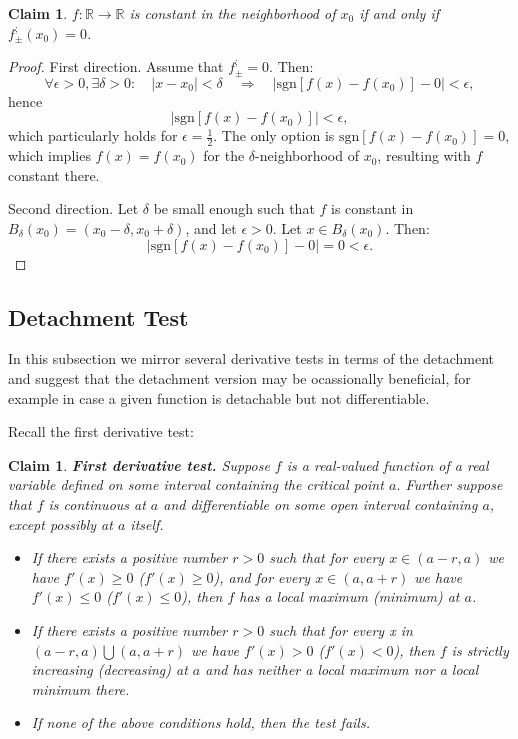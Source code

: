 \documentclass[11pt]{book}
\newtheorem{clm}[thm]{Claim}
\begin{document}
\begin{clm}\label{constancy_condition}$f:\mathbb{R}\rightarrow\mathbb{R}$ is constant in the neighborhood
of $x_{0}$ if and only if $f_{\pm}^{;}\left(x_{0}\right)=0$.
\end{clm}

\begin{proof}First direction. Assume that $f_{\pm}^{;}=0$. Then:
\[
\forall\epsilon>0,\exists\delta>0:\quad\left|x-x_{0}\right|<\delta\quad\Longrightarrow\quad\left|\text{sgn}\left[f\left(x\right)-f\left(x_{0}\right)\right]-0\right|<\epsilon,
\]
hence $$\left|\text{sgn}\left[f\left(x\right)-f\left(x_{0}\right)\right]\right|<\epsilon,$$
which particularly holds for $\epsilon=\frac{1}{2}$. The only option
is $\text{sgn}\left[f\left(x\right)-f\left(x_{0}\right)\right]=0$, which
implies $f\left(x\right)=f\left(x_{0}\right)$ for the $\delta$-neighborhood
of $x_{0}$, resulting with $f$ constant there.

Second direction. Let $\delta$ be small enough such that $f$ is
constant in $B_{\delta}\left(x_{0}\right)=\left(x_{0}-\delta,x_{0}+\delta\right)$,
and let $\epsilon>0$. Let $x\in B_{\delta}\left(x_{0}\right)$. Then:
\[
\left|\text{sgn}\left[f\left(x\right)-f\left(x_{0}\right)\right]-0\right|=0<\epsilon.
\]
\end{proof}

\subsection{Detachment Test}

In this subsection we mirror several derivative tests in terms of the detachment and suggest that the detachment version may be ocassionally beneficial, for example in case a given function is detachable but not differentiable.

Recall the first derivative test:

\begin{clm}\textbf{First derivative test. }Suppose $f$ is a real-valued function
of a real variable defined on some interval containing the critical
point $a$. Further suppose that $f$ is continuous at $a$ and differentiable
on some open interval containing $a$, except possibly at $a$ itself.
\begin{itemize}
\item If there exists a positive number $r>0$ such that for every $x\in\left(a-r,a\right)$
we have $f'\left(x\right)\geq0$ ($f'\left(x\right)\geq0$), and for
every $x\in\left(a,a+r\right)$ we have $f'\left(x\right)\leq0$ ($f'\left(x\right)\leq0$),
then $f$ has a local maximum (minimum) at $a$.
\item If there exists a positive number $r>0$ such that for
every x in $\left(a-r,a\right)\bigcup\left(a,a+r\right)$ we have
$f'\left(x\right)>0$ ($f'\left(x\right)<0$), then $f$ is strictly
increasing (decreasing) at $a$ and has neither a local maximum nor
a local minimum there.
\item If none of the above conditions hold, then the test fails.
\end{itemize}
\label{first_derivative_test}
\end{clm}
\end{document}
